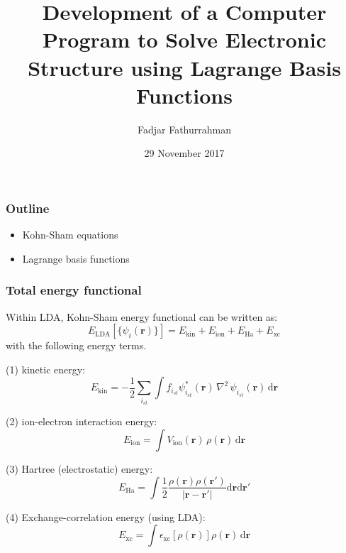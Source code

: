 \documentclass[8pt]{beamer}
\begin{document}
\title{Development of a Computer Program to Solve Electronic Structure using
Lagrange Basis Functions}
\author{Fadjar Fathurrahman}
\date{29 November 2017}

\frame{\titlepage}

\begin{frame}
\frametitle{Outline}

\begin{itemize}
\item Kohn-Sham equations
\item Lagrange basis functions
\end{itemize}

\end{frame}

\begin{frame}
\frametitle{Total energy functional}

Within LDA, Kohn-Sham energy functional can be written as:
\begin{equation}
E_{\mathrm{LDA}}\left[\{\psi_{i}(\mathbf{r})\}\right] =
E_{\mathrm{kin}} + E_{\mathrm{ion}} + E_{\mathrm{Ha}} + E_{\mathrm{xc}}
\end{equation}
with the following energy terms.

(1) kinetic energy:
\begin{equation}
E_{\mathrm{kin}} = -\frac{1}{2}\sum_{i_{st}}
\int f_{i_{st}}
\psi_{i_{st}}^{*}(\mathbf{r})\,\nabla^2\,\psi_{i_{st}}(\mathbf{r})
\,\mathrm{d}\mathbf{r}
\end{equation}

(2) ion-electron interaction energy:
\begin{equation}
E_{\mathrm{ion}} = \int V_{\mathrm{ion}}(\mathbf{r})\, \rho(\mathbf{r})\,
\mathrm{d}\mathbf{r}
\end{equation}

(3) Hartree (electrostatic) energy:
\begin{equation}
E_{\mathrm{Ha}} = \int \frac{1}{2}
\dfrac{\rho(\mathbf{r})\rho(\mathbf{r}')}
{\left|\mathbf{r} - \mathbf{r}'\right|}
\mathrm{d}\mathbf{r}\mathrm{d}\mathbf{r}'
\end{equation}

(4) Exchange-correlation energy (using LDA):
\begin{equation}
E_{\mathrm{xc}} = \int \epsilon_{\mathrm{xc}}\left[\rho(\mathbf{r})\right]
\rho(\mathbf{r})\,\mathrm{d}\mathbf{r}
\end{equation}

\end{frame}
\end{document}
